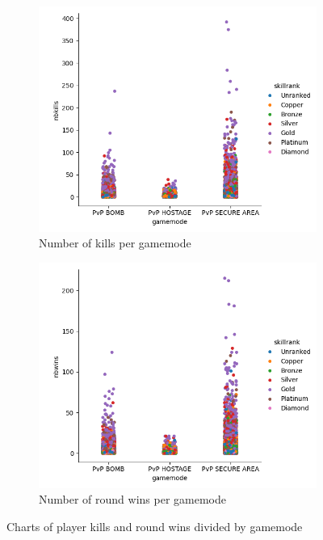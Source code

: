 \documentclass[12pt]{article}
\begin{document}
\begin{figure}[H]
	\begin{subfigure}[h]{0.49\linewidth}
		\includegraphics[width=\textwidth]{kills-gamemode}
		\caption{Number of kills per gamemode}
	\end{subfigure}
	\hfill
	\begin{subfigure}[h]{0.49\linewidth}
		\includegraphics[width=\textwidth]{wins-gamemode}
		\caption{Number of round wins per gamemode}
	\end{subfigure}
	\caption{Charts of player kills and round wins divided by gamemode}
	\label{fig:wins-kills-gamemode}
\end{figure}
\end{document}
